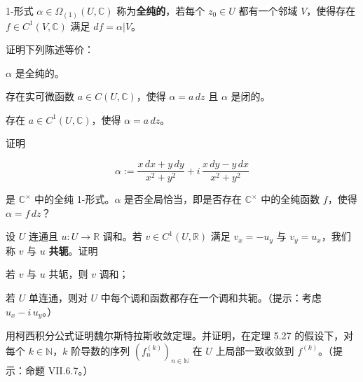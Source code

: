 \begin{exercises}
1-形式 $ \alpha \in \Omega_{(1)}(U,\mathbb{C}) $ 称为\textbf{全纯的}，若每个 $ z_0 \in U $ 都有一个邻域 $ V $，使得存在 $ f \in C^1(V,\mathbb{C}) $ 满足 $ df = \alpha|V $。

\begin{items}
\item

证明下列陈述等价：

\begin{subitems}
\item

$ \alpha $ 是全纯的。

\item

存在实可微函数 $ a \in C(U,\mathbb{C}) $，使得 $ \alpha = a\,dz $ 且 $ \alpha $ 是闭的。

\item

存在 $ a \in C^1(U,\mathbb{C}) $，使得 $ \alpha = a\,dz $。

\end{subitems}

\item

证明

\[
\alpha := \frac{x\,dx + y\,dy}{x^2 + y^2} + i\,\frac{x\,dy - y\,dx}{x^2 + y^2}
\]

是 $ \mathbb{C}^{\times} $ 中的全纯 1-形式。$ \alpha $ 是否全局恰当，即是否存在 $ \mathbb{C}^{\times} $ 中的全纯函数 $ f $，使得 $ \alpha = f\,dz $？

\end{items}

\item

设 $ U $ 连通且 $ u : U \to \mathbb{R} $ 调和。若 $ v \in C^1(U,\mathbb{R}) $ 满足 $ v_x = -u_y $ 与 $ v_y = u_x $，我们称 $ v $ 与 $ u $ \textbf{共轭}。证明

\begin{items}
\item

若 $ v $ 与 $ u $ 共轭，则 $ v $ 调和；

\item

若 $ U $ 单连通，则对 $ U $ 中每个调和函数都存在一个调和共轭。（提示：考虑 $ u_x - i\,u_y $。）

\end{items}

\item

用柯西积分公式证明魏尔斯特拉斯收敛定理。并证明，在定理 5.27 的假设下，对每个 $ k \in \mathbb{N} $，$ k $ 阶导数的序列 $ (f_n^{(k)})_{n \in \mathbb{N}} $ 在 $ U $ 上局部一致收敛到 $ f^{(k)} $。（提示：命题 VII.6.7。）


\end{exercises}
